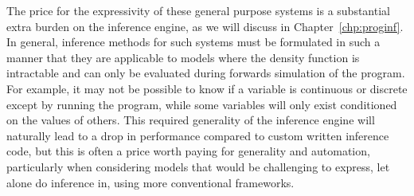 The price for the expressivity of these general purpose systems is a substantial extra 
burden on the inference engine, as we will
discuss in Chapter~\ref{chp:proginf}.  In general, inference methods for such systems 
must be formulated in such a manner that they are applicable to models where the 
density function is intractable and can only be evaluated during forwards simulation of the program. 
For example, it may not be possible to know if a variable is continuous or discrete except by
running the program, while some variables will only exist conditioned on the values of others.
This required generality of the inference engine will naturally lead to a drop in performance compared to
custom written inference code, but this is often a price worth paying for generality and automation, particularly
when considering models that would be challenging to express, let alone do inference in, using more
conventional frameworks.